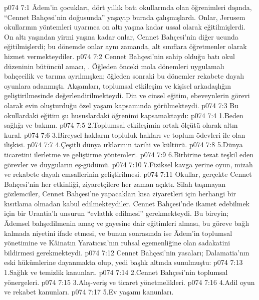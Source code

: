 \vs p074 7:1 Âdem’in çocukları, dört yıllık batı okullarında olan öğrenimleri dışında, “Cennet Bahçesi’nin doğusunda” yaşayıp burada çalışmışlardı. Onlar, Jerusem okullarının yöntemleri uyarınca on altı yaşına kadar ussal olarak eğitilmişlerdi. On altı yaşından yirmi yaşına kadar onlar, Cennet Bahçesi’nin diğer ucunda eğitilmişlerdi; bu dönemde onlar aynı zamanda, alt sınıflara öğretmenler olarak hizmet vermekteydiler.
\vs p074 7:2 Cennet Bahçesi’nin sahip olduğu batı okul düzeninin bütüncül amacı, . Öğleden önceki mola dönemleri uygulamalı bahçecilik ve tarıma ayrılmışken; öğleden sonraki bu dönemler rekabete dayalı oyunlara adanmıştı. Akşamları, toplumsal etkileşim ve kişisel arkadaşlığın geliştirilmesinde değerlendirilmekteydi. Din ve cinsel eğitim, ebeveynlerin görevi olarak evin oluşturduğu özel yaşam kapsamında görülmekteydi.
\vs p074 7:3 Bu okullardaki eğitim şu hususlardaki öğrenimi kapsamaktaydı:
\vs p074 7:4 1.\bibnobreakspace Beden sağlığı ve bakımı.
\vs p074 7:5 2.\bibnobreakspace Toplumsal etkileşimin ortak ölçütü olarak altın kural.
\vs p074 7:6 3.\bibnobreakspace Bireysel hakların topluluk hakları ve toplum ödevleri ile olan ilişkisi.
\vs p074 7:7 4.\bibnobreakspace Çeşitli dünya ırklarının tarihi ve kültürü.
\vs p074 7:8 5.\bibnobreakspace Dünya ticaretini ilerletme ve geliştirme yöntemleri.
\vs p074 7:9 6.\bibnobreakspace Birbirine tezat teşkil eden görevler ve duyguların eş\hyp{}güdümü.
\vs p074 7:10 7.\bibnobreakspace Fiziksel kavga yerine oyun, mizah ve rekabete dayalı emsallerinin geliştirilmesi.
\vs p074 7:11 Okullar, gerçekte Cennet Bahçesi’nin her etkinliği, ziyaretçilere her zaman açıktı. Silah taşımayan gözlemciler, Cennet Bahçesi’ne yapacakları kısa ziyaretleri için herhangi bir kısıtlama olmadan kabul edilmekteydiler. Cennet Bahçesi’nde ikamet edebilmek için bir Urantia’lı unsurun “evlatlık edilmesi” gerekmekteydi. Bu bireyin; Âdemsel bahşedilmenin amaç ve gayesine dair eğitimleri alması, bu göreve bağlı kalmada niyetini ifade etmesi, ve bunun sonrasında ise Âdem’in toplumsal yönetimine ve Kâinatın Yaratıcısı’nın ruhsal egemenliğine olan sadakatini bildirmesi gerekmekteydi.
\vs p074 7:12 Cennet Bahçesi’nin yasaları; Dalamatia’nın eski hükümlerine dayanmakta olup, yedi başlık altında sunulmuştu:
\vs p074 7:13 1.\bibnobreakspace Sağlık ve temizlik kanunları.
\vs p074 7:14 2.\bibnobreakspace Cennet Bahçesi’nin toplumsal yönergeleri.
\vs p074 7:15 3.\bibnobreakspace Alış\hyp{}veriş ve ticaret yönetmelikleri.
\vs p074 7:16 4.\bibnobreakspace Adil oyun ve rekabet kanunları.
\vs p074 7:17 5.\bibnobreakspace Ev yaşamı kanunları.
